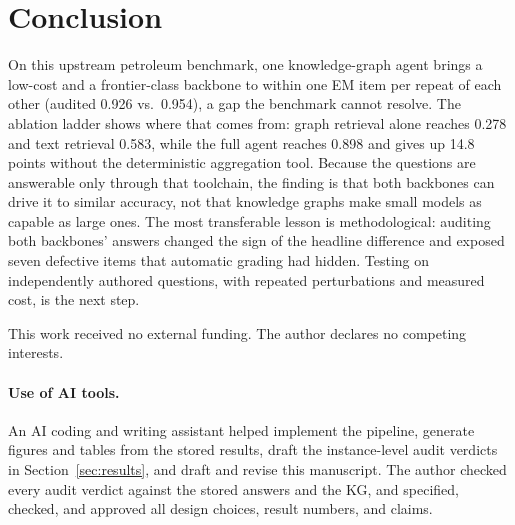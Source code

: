 \documentclass{article}
\begin{document}
\section{Conclusion}

On this upstream petroleum benchmark, one knowledge-graph agent brings a
low-cost and a frontier-class backbone to within one EM item per repeat of
each other (audited 0.926 vs.\ 0.954), a gap the benchmark cannot resolve. The
ablation ladder shows where that comes from: graph retrieval alone reaches
0.278 and text retrieval 0.583, while the full agent reaches 0.898 and gives up
14.8 points without the deterministic aggregation tool. Because the questions
are answerable only through that toolchain, the finding is that both backbones
can drive it to similar accuracy, not that knowledge graphs make small models
as capable as large ones. The most transferable lesson is methodological:
auditing both backbones' answers changed the sign of the headline difference
and exposed seven defective items that automatic grading had hidden. Testing on
independently authored questions, with repeated perturbations and measured
cost, is the next step.

\begin{ack}
This work received no external funding. The author declares no competing
interests.
\end{ack}

\paragraph{Use of AI tools.} An AI coding and writing assistant helped
implement the pipeline, generate figures and tables from the stored results,
draft the instance-level audit verdicts in Section~\ref{sec:results}, and draft
and revise this manuscript. The author checked every audit verdict against the
stored answers and the KG, and specified, checked, and approved all design
choices, result numbers, and claims.
\end{document}

